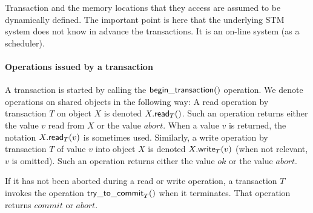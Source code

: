 Transaction and the memory locations that they access
are assumed to be dynamically defined. The important point is here 
that the  underlying STM system does not know in advance the transactions. 
It is an  on-line system (as a scheduler).  



\paragraph{Operations issued by a transaction}
A transaction is started by calling the ${\sf begin\_transaction}()$ operation.
We denote operations on shared objects in the following way:
A read operation by transaction $T$ on object $X$ is denoted
$X.{\sf read}_T()$. Such an operation returns either the value $v$ read from 
$X$ or the value $abort$.  When a value $v$ is returned, 
the notation  $X.{\sf read}_T(v)$ is sometimes used.  
%
Similarly, a write operation by transaction $T$ of value $v$ into object 
$X$ is denoted $X.{\sf write}_T(v)$ (when not relevant, $v$ is omitted). 
Such an operation returns either the value $ok$ or the value $abort$. 
%

If  it  has  not  been  aborted  during a  read  or  write  operation,    a
transaction $T$ invokes  the operation ${\sf try\_to\_commit}_T()$ when 
it terminates. That operation returns $commit$ or $abort$. 





